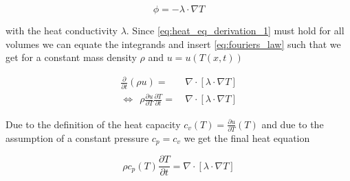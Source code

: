 \documentclass{scrartcl}[12pt, halfparskip]
\numberwithin{equation}{section}
\numberwithin{figure}{section}
\numberwithin{table}{section}
\newcommand{\todo}[1]{\textcolor{red}{TODO: #1}}
\begin{document}
\begin{equation}
	\phi = - \lambda \cdot \nabla T
	\label{eq:fouriers_law}
\end{equation}

with the heat conductivity $\lambda$. Since \eqref{eq:heat_eq_derivation_1} must hold for all volumes we can equate the integrands and insert \eqref{eq:fouriers_law} such that we get for a constant mass density $\rho$ and $u = u(T(x,t))$

\begin{align}
	\frac{\partial}{\partial t}(\rho u) = & \ \nabla \cdot \left[ \lambda \cdot \nabla T \right] \\
	\Leftrightarrow \ \ \rho \frac{\partial u}{\partial T} \frac{\partial T}{\partial t} = & \ \nabla \cdot \left[ \lambda \cdot \nabla T \right]
\end{align}

Due to the definition of the heat capacity $c_v(T) = \frac{\partial u}{\partial T}(T)$ and due to the assumption of a constant pressure $c_p = c_v$ we get the final heat equation

\begin{equation}
	\rho c_p(T) \frac{\partial T}{\partial t} = \nabla \cdot \left[ \lambda \cdot \nabla T \right]
	\label{eq:heat_equation_derivation}
\end{equation}




%
%
%
%
%
%
%
%
\end{document}
